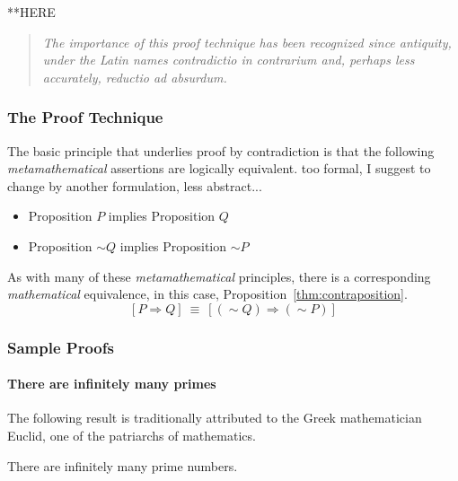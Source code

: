 **HERE

\begin{quote}
{\em The importance of this proof technique has been recognized since
  antiquity, under the Latin names {\em contradictio in contrarium}
  and, perhaps less accurately, {\em reductio ad absurdum}.}
\end{quote}



\subsubsection{The Proof Technique}
\label{sec:contradiction-technique}


The basic principle that underlies proof by contradiction is that the
following {\em metamathematical} assertions are logically equivalent.
{\Denis too formal, I suggest to change by another formulation, less abstract...}
\begin{itemize}
\item
Proposition $P$ {\sc implies} Proposition $Q$
\item
Proposition $\sim Q$ {\sc implies} Proposition $\sim P$
\end{itemize}

As with many of these {\em metamathematical} principles, there is a
corresponding {\em mathematical} equivalence, in this case,
Proposition~\ref{thm:contraposition}.
\[ [P \Rightarrow Q] \ \equiv \ [(\sim Q) \Rightarrow (\sim P)] \]


\subsubsection{Sample Proofs}
\label{sec:sample-contradictions}

\paragraph{\small\sf There are infinitely many primes}

The following result is traditionally attributed to the Greek
mathematician Euclid,
one of the patriarchs of mathematics.

\begin{prop}
\label{thm:Primes-infinite}
There are infinitely many prime numbers.
\end{prop}

